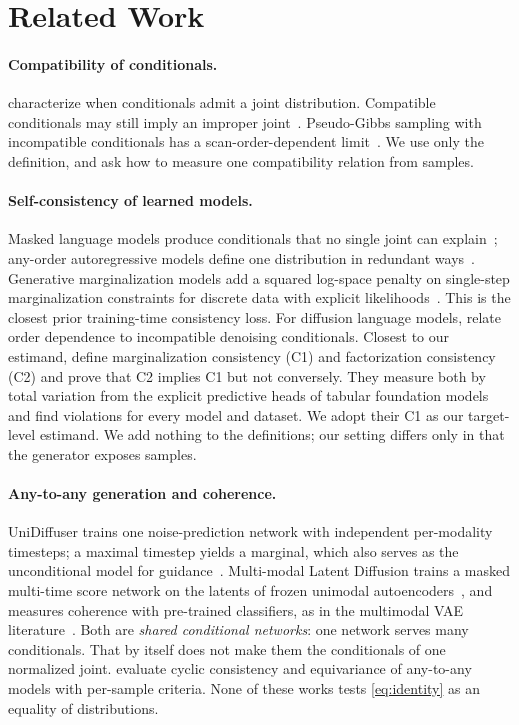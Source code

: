 \documentclass{article}
\theoremstyle{plain}
\theoremstyle{definition}
\theoremstyle{remark}
\begin{document}
\section{Related Work}
\label{sec:related}

\paragraph{Compatibility of conditionals.}
\citet{arnold1989compatible} characterize when conditionals admit a joint distribution. Compatible conditionals may still imply an improper joint~\citep{hobert1998functional}.
Pseudo-Gibbs sampling with incompatible conditionals has a scan-order-dependent limit~\citep{heckerman2000dependency,chen2015gibbs,liu2014imputation}.
We use only the definition, and ask how to measure one compatibility relation from samples.

\paragraph{Self-consistency of learned models.}
Masked language models produce conditionals that no single joint can explain~\citep{young2023mlm}; any-order autoregressive models define one distribution in redundant ways~\citep{shih2022aoarm}.
Generative marginalization models add a squared log-space penalty on single-step marginalization constraints for discrete data with explicit likelihoods~\citep{liu2024gmm}. This is the closest prior training-time consistency loss.
For diffusion language models, \citet{kim2026pathdependent} relate order dependence to incompatible denoising conditionals.
Closest to our estimand, \citet{klotergens2026tabular} define marginalization consistency (C1) and factorization consistency (C2) and prove that C2 implies C1 but not conversely. They measure both by total variation from the explicit predictive heads of tabular foundation models and find violations for every model and dataset.
We adopt their C1 as our target-level estimand. We add nothing to the definitions; our setting differs only in that the generator exposes samples.

\paragraph{Any-to-any generation and coherence.}
UniDiffuser trains one noise-prediction network with independent per-modality timesteps; a maximal timestep yields a marginal, which also serves as the unconditional model for guidance~\citep{bao2023unidiffuser}.
Multi-modal Latent Diffusion trains a masked multi-time score network on the latents of frozen unimodal autoencoders~\citep{bounoua2023mld}, and measures coherence with pre-trained classifiers, as in the multimodal VAE literature~\citep{wu2018mvae,shi2019mmvae,sutter2021mopoe,daunhawer2022limitations}.
Both are \emph{shared conditional networks}: one network serves many conditionals. That by itself does not make them the conditionals of one normalized joint.
\citet{chung2025anytoany} evaluate cyclic consistency and equivariance of any-to-any models with per-sample criteria.
None of these works tests \eqref{eq:identity} as an equality of distributions.
\end{document}
